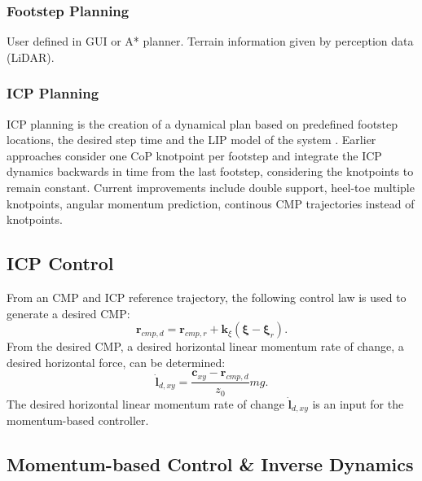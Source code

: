 \subsubsection{Footstep Planning}
User defined in \ac{GUI} or A* planner. Terrain information given by perception data (LiDAR).
\subsubsection{ICP Planning}
\ac{ICP} planning is the creation of a dynamical plan based on predefined footstep locations, the desired step time and the \ac{LIP} model of the system . Earlier approaches consider one \ac{CoP} knotpoint per footstep and integrate the \ac{ICP} dynamics backwards in time from the last footstep, considering the knotpoints to remain constant. Current improvements include double support, heel-toe multiple knotpoints, angular momentum prediction, continous \ac{CMP} trajectories instead of knotpoints.
\subsection{ICP Control}
From an \ac{CMP} and \ac{ICP} reference trajectory, the following control law is used to generate a desired \ac{CMP}:
\begin{equation}
    \mathbf{r}_{cmp,d}=\mathbf{r}_{cmp,r} + \mathbf{k}_{\xi}(\mathbf{\xi}-\mathbf{\xi}_r).
\end{equation}
From the desired \ac{CMP}, a desired horizontal linear momentum rate of change, a desired horizontal force, can be determined:
\begin{equation}
    \dot{\mathbf{l}}_{d,xy} = \frac{\mathbf{c}_{xy}-\mathbf{r}_{cmp,d}}{z_0}mg.
\end{equation}
The desired horizontal linear momentum rate of change $ \dot{\mathbf{l}}_{d,xy}$ is an input for the momentum-based controller.
\subsection{Momentum-based Control \& Inverse Dynamics}
